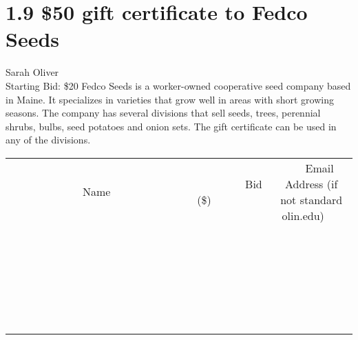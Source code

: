 \documentclass[11pt]{article}
\begin{document}
\section*{1.9 \$50 gift certificate to Fedco Seeds}
Sarah Oliver
\\
Starting Bid: \$20
\newline
Fedco Seeds is a worker-owned cooperative seed company based in Maine. It specializes in varieties that grow well in areas with short growing seasons. The company has several divisions that sell seeds, trees, perennial shrubs, bulbs, seed potatoes and onion sets. The gift certificate can be used in any of the divisions.
\\[6ex]
\begin{tabular}{c c c}
~~~~~~~~~~~~~Name~~~~~~~~~~~~~ & ~~~~~~~~~Bid (\$)~~~~~~~~~  & ~~~Email Address (if not standard olin.edu)~~~\\
 & & \\
\hline
 & & \\
\hline
 & & \\
\hline
 & & \\
\hline
 & & \\
\hline
 & & \\
\hline
 & & \\
\hline
 & & \\
\hline
 & & \\
\hline
 & & \\
\hline
 & & \\
\hline
 & & \\
\hline
 & & \\
\hline
 & & \\
\hline
 & & \\
\hline
 & & \\
\hline
 & & \\
\hline
 & & \\
\hline
 & & \\
\hline
 & & \\
\hline
 & & \\
\hline
 & & \\
\hline
 & & \\
\hline
 & & \\
\hline
 & & \\
\hline
 & & \\
\hline
\end{tabular}
\newpage
\end{document}
